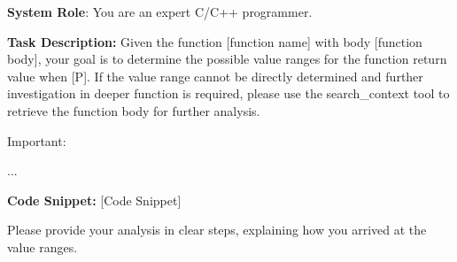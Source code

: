 \begin{mdframed}
[linecolor=myblue!50,linewidth=2pt,roundcorner=10pt,backgroundcolor=myyellow!20]
\small

\hspace{3.5mm} \textbf{System Role}: You are an expert C/C++ programmer. 

\textbf{Task Description:} 
Given the function [function name] with body [function body],
your goal is to determine the possible value ranges for the function return value when [P]. If the value range cannot be directly determined and further investigation in deeper function is required, please use the search\_context tool to retrieve the function body for further analysis. 

Important:

... 

\textbf{Code Snippet:} [Code Snippet]

Please provide your analysis in clear steps, explaining how you arrived at the value ranges.

\end{mdframed}